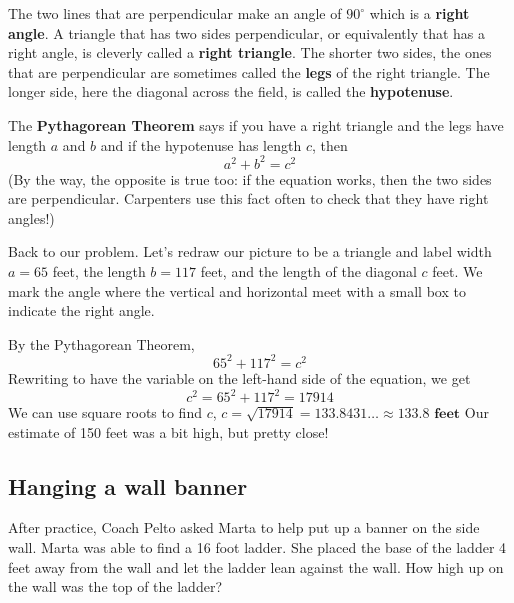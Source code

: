 The two lines that are perpendicular make an angle of $90^\circ$ which is a \textbf{right angle}.  A triangle that has two sides perpendicular, or equivalently that has a right angle, is cleverly called a \textbf{right triangle}.  The shorter two sides, the ones that are perpendicular are sometimes called the \textbf{legs} of the right triangle.  The longer side, here the diagonal across the field, is called the \textbf{hypotenuse}.  

The \textbf{Pythagorean Theorem} says if you have a right triangle and the legs have length $a$ and $b$ and if the hypotenuse has length $c$, then $$a^2+b^2=c^2$$
(By the way, the opposite is true too: if the equation works, then the two sides are perpendicular.  Carpenters use this fact often to check that they have right angles!)

Back to our problem.  Let's redraw our picture to be a triangle and label width $a=65$ feet, the length $b=117$ feet, and the length of the diagonal $c$ feet.  We mark the angle where the vertical and horizontal meet with a small box to indicate the right angle.  

 \begin{center}
 \end{center}

By the Pythagorean Theorem,
$$65^2 + 117^2 = c^2$$
Rewriting to have the variable on the left-hand side of the equation, we get 
$$c^2 = 65^2 + 117^2 = 17914$$
We can use square roots to find $c$,
$c = \sqrt{17914} = 133.8431\ldots \approx 133.8 \textbf{ feet}$
Our estimate of 150 feet was a bit high, but pretty close!

\subsection*{Hanging a wall banner}

After practice, Coach Pelto asked Marta to help put up a banner on the side wall.  Marta was able to find a 16 foot ladder.  She placed the base of the ladder 4 feet away from the wall and let the ladder lean against the wall. How high up on the wall was the top of the ladder?

